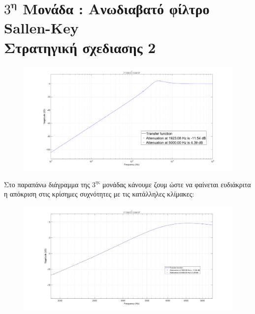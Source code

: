 \documentclass{article}
\begin{document}
{{{\section*{$3^\textbf{η}$ Μονάδα : Ανωδιαβατό φίλτρο Sallen-Key \\ Στρατηγική σχεδιασης 2} 
  \begin{figure}[h!]
\centering
 	\advance\leftskip-4cm
  \includegraphics[width=190mm,scale=2]{thema4/t3.png}
\end{figure}  
\normalsize{}
Στο παραπάνω διάγραμμα της $3^{ης}$ μονάδας κάνουμε ζουμ ώστε να φαίνεται ευδιάκριτα η απόκριση στις κρίσημες συχνότητες με τις κατάλληλες κλίμακες:
\large{}
  \begin{figure}[h!]
\centering
 	\advance\leftskip-1cm
  \includegraphics[width=120mm,scale=2]{thema4/z3.jpg}
\end{figure} 
\newpage
}}}
\end{document}
